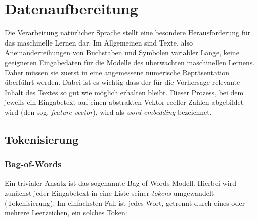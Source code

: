 
\section{Datenaufbereitung}\label{sec:datenaufbereitung}

Die Verarbeitung natürlicher Sprache stellt eine besondere Herausforderung für das maschinelle Lernen dar. Im Allgemeinen sind Texte, also Aneinanderreihungen von Buchstaben und Symbolen variabler Länge, keine geeigneten Eingabedaten für die Modelle des überwachten maschinellen Lernens. Daher müssen sie zuerst in eine angemessene numerische Repräsentation überführt werden. Dabei ist es wichtig dass der für die Vorhersage relevante Inhalt des Textes so gut wie möglich erhalten bleibt. Dieser Prozess, bei dem jeweils ein Eingabetext auf einen abstrakten Vektor reeller Zahlen abgebildet wird (den sog. \textit{feature vector}), wird als \textit{word embedding} bezeichnet. 

\subsection{Tokenisierung}

\subsubsection{Bag-of-Words}
Ein trivialer Ansatz ist das sogenannte Bag-of-Words-Modell. Hierbei wird zunächst jeder Eingabetext in eine Liste seiner \textit{tokens} umgewandelt (Tokenisierung). Im einfachsten Fall ist jedes Wort, getrennt durch eines oder mehrere Leerzeichen, ein solches Token:

\begin{figure}[H]
    \centering
    \caption{}
    \label{fig:tokenize_words}
\end{figure}


